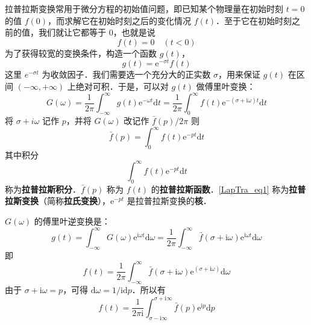 
拉普拉斯变换常用于微分方程的初始值问题，即已知某个物理量在初始时刻 $t=0$ 的值 $f(0)$，而求解它在初始时刻之后的变化情况 $f(t)$．至于它在初始时刻之前的值，我们就让它都等于 $0$，也就是说
\begin{equation}
f(t)=0 \quad(t<0)
\end{equation}
为了获得较宽的变换条件，构造一个函数 $g(t)$，
\begin{equation}
g(t)=\mathrm{e}^{-\sigma t} f(t)
\end{equation}
这里 $e^{-\sigma t}$ 为收敛因子．我们需要选一个充分大的正实数 $\sigma$，用来保证 $g(t) $ 在区间 $(-\infty,+\infty)$ 上绝对可积．于是，可以对 $g(t) $ 做傅里叶变换：
\begin{equation}
G(\omega)=\frac{1}{2 \pi} \int_{-\infty}^{\infty} g(t) \mathrm{e}^{-\omega t} \mathrm{d} t=\frac{1}{2 \pi} \int_{0}^{\infty} f(t) \mathrm{e}^{-(\sigma+\mathrm{i} \omega) t} \mathrm{d} t
\end{equation}
将 $\sigma+i \omega$ 记作 $p$，并将 $G(\omega)$ 改记作 $\bar f(p) / 2 \pi$ 则
\begin{equation} \label{LapTra_eq1}
\bar{f}(p)=\int_{0}^{\infty} f(t) \mathrm{e}^{-p t} \mathrm{d} t
\end{equation}
其中积分
\begin{equation}
\int_{0}^{\infty} f(t) \mathrm{e}^{-p t} \mathrm{d} t
\end{equation}
称为\textbf{拉普拉斯积分}．$\bar f(p)$ 称为 $f(t)$ 的\textbf{拉普拉斯函数}．\autoref{LapTra_eq1} 称为\textbf{拉普拉斯变换}（简称\textbf{拉氏变换}），$\mathrm e^{-pt}$ 是拉普拉斯变换的\textbf{核}．

$G(\omega)$ 的傅里叶逆变换是：
\begin{equation}
g(t)=\int_{-\infty}^{\infty} G(\omega) \mathrm{e}^{\mathrm{i} \omega t} \mathrm{d} \omega=\frac{1}{2 \pi} \int_{-\infty}^{\infty} \bar{f}(\sigma+\mathrm{i} \omega) \mathrm{e}^{\mathrm{i} \omega t} \mathrm{d} \omega
\end{equation}
即
\begin{equation}
f(t)=\frac{1}{2 \pi} \int_{-\infty}^{\infty} \bar{f}(\sigma+\mathrm{i} \omega) \mathrm{e}^{(\sigma+\mathrm{i} \omega)} \mathrm{d} \omega
\end{equation}
由于 $\sigma+\mathrm i\omega=p$，可得 $\mathrm d\omega = 1/\mathrm i\mathrm dp$．所以有
\begin{equation}
f(t)=\frac{1}{2 \pi \mathrm{i}} \int_{\sigma-\mathrm{i} \infty}^{\sigma+\mathrm{i} \infty} \bar{f}(p) \mathrm{e}^{\mathrm{i} p} \mathrm{d} p
\end{equation}

